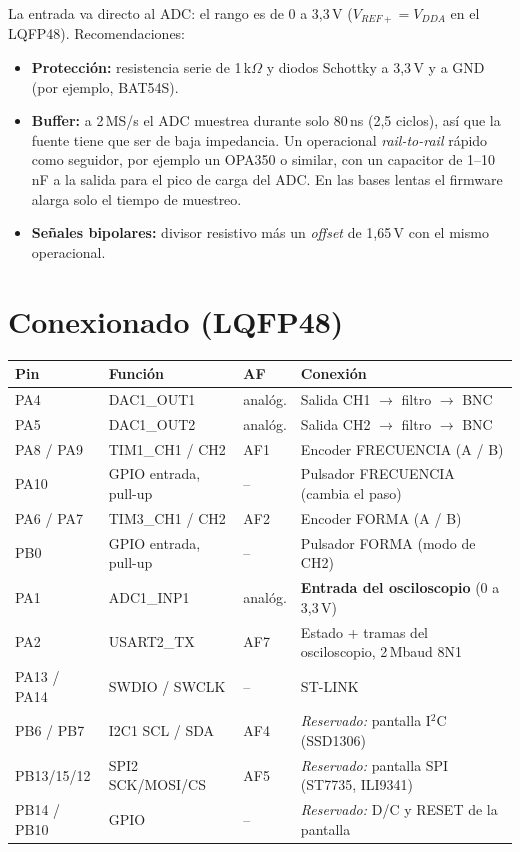 \documentclass[11pt,a4paper]{article}
\begin{document}
La entrada va directo al ADC: el rango es de 0 a 3,3\,V
($V_{REF+} = V_{DDA}$ en el LQFP48). Recomendaciones:
\begin{itemize}\itemsep0pt
  \item \textbf{Protección:} resistencia serie de 1\,k$\Omega$ y diodos Schottky
        a 3,3\,V y a GND (por ejemplo, BAT54S).
  \item \textbf{Buffer:} a 2\,MS/s el ADC muestrea durante solo 80\,ns
        (2,5 ciclos), así que la fuente tiene que ser de baja impedancia. Un
        operacional \emph{rail-to-rail} rápido como seguidor, por ejemplo un
        OPA350 o similar, con un capacitor de 1--10\,nF a la salida para el
        pico de carga del ADC. En las bases lentas el firmware alarga solo el
        tiempo de muestreo.
  \item \textbf{Señales bipolares:} divisor resistivo más un \emph{offset} de
        1,65\,V con el mismo operacional.
\end{itemize}

\clearpage
\section{Conexionado (LQFP48)}

\begin{center}
\begin{tabular}{@{}llll@{}}
\toprule
\textbf{Pin} & \textbf{Función} & \textbf{AF} & \textbf{Conexión} \\
\midrule
PA4  & DAC1\_OUT1 & analóg. & Salida CH1 $\rightarrow$ filtro $\rightarrow$ BNC \\
PA5  & DAC1\_OUT2 & analóg. & Salida CH2 $\rightarrow$ filtro $\rightarrow$ BNC \\
PA8 / PA9 & TIM1\_CH1 / CH2 & AF1 & Encoder FRECUENCIA (A / B) \\
PA10 & GPIO entrada, pull-up & -- & Pulsador FRECUENCIA (cambia el paso) \\
PA6 / PA7 & TIM3\_CH1 / CH2 & AF2 & Encoder FORMA (A / B) \\
PB0  & GPIO entrada, pull-up & -- & Pulsador FORMA (modo de CH2) \\
PA1  & ADC1\_INP1 & analóg. & \textbf{Entrada del osciloscopio} (0 a 3,3\,V) \\
PA2  & USART2\_TX & AF7 & Estado + tramas del osciloscopio, 2\,Mbaud 8N1 \\
PA13 / PA14 & SWDIO / SWCLK & -- & ST-LINK \\
\midrule
PB6 / PB7 & I2C1 SCL / SDA & AF4 & \emph{Reservado:} pantalla I$^2$C (SSD1306) \\
PB13/15/12 & SPI2 SCK/MOSI/CS & AF5 & \emph{Reservado:} pantalla SPI (ST7735, ILI9341) \\
PB14 / PB10 & GPIO & -- & \emph{Reservado:} D/C y RESET de la pantalla \\
\bottomrule
\end{tabular}
\end{center}
\end{document}
